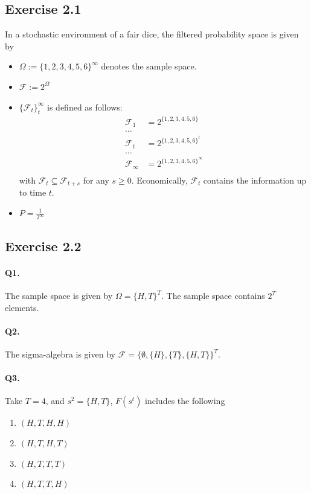 \documentclass[11pt]{article}
\theoremstyle{definition}
\theoremstyle{boldtitle} %
\numberwithin{equation}{section}
\numberwithin{figure}{section}
\numberwithin{table}{section}
\begin{document}
\subsection*{Exercise 2.1}
In a stochastic environment of a fair dice, the filtered probability space is given by 
\begin{itemize}
    \item $\Omega := \{1, 2, 3, 4, 5, 6 \}^\infty$ denotes the sample space.
    \item $\mathcal{F} := 2^\Omega$
    \item $\{\mathcal{F}_t\}_t^\infty$ is defined as follows:
    \begin{align*}
        \mathcal{F}_1 & = 2^{\{1, 2, 3, 4, 5, 6\}} \\
        \dots \\
        \mathcal{F}_t & = 2^{\{1, 2, 3, 4, 5, 6\}^t} \\
        \dots \\ 
        \mathcal{F}_\infty & = 2^{\{1, 2, 3, 4, 5, 6\}^\infty} \\
    \end{align*}
    with $\mathcal{F}_{t} \subseteq \mathcal{F}_{t+s}$ for any $s \geq 0$. 
    Economically, $\mathcal{F}_{t}$ contains the information up to time $t$.
    \item $P = \frac{1}{2^\infty}$
\end{itemize}

\subsection*{Exercise 2.2}
\paragraph{Q1.} The sample space is given by $\Omega = \{H, T\}^T$.
The sample space contains $2^T$ elements.

\paragraph{Q2.} The sigma-algebra is given by 
$\mathcal{F} = \{\emptyset, \{H\}, \{T\}, \{H, T\} \}^T$.

\paragraph{Q3.} Take $T=4$, and $s^2 = \{ H,T \}$, $F(s^t)$ includes the following 
\begin{enumerate}
    \item $(H, T, H, H)$
    \item $(H, T, H, T)$
    \item $(H, T, T, T)$
    \item $(H, T, T, H)$
\end{enumerate}
\end{document}
